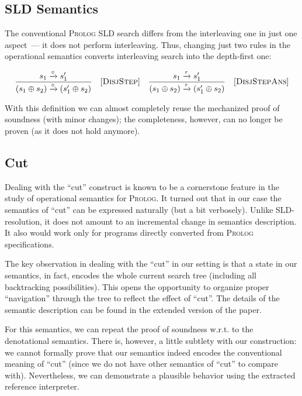 \subsection{SLD Semantics}
\label{sld}

The conventional \textsc{Prolog} SLD search differs from the interleaving one in just one aspect~--- it does not perform interleaving.
Thus, changing just two rules in the operational semantics converts interleaving search into the depth-first one:

\[
  \begin{array}{crcr}
    \dfrac{s_1 \xrightarrow{\circ} s'_1}{(s_1 \oplus s_2) \xrightarrow{\circ} (s'_1 \oplus s_2)} &\mbox{[\textsc{DisjStep}]}&
    \dfrac{s_1 \xrightarrow{r} s'_1}{(s_1 \oplus s_2) \xrightarrow{r} (s'_1 \oplus s_2)} &\mbox{[\textsc{DisjStepAns}]}
  \end{array}
\]
\vskip3mm

With this definition we can almost completely reuse the mechanized proof of soundness (with minor changes); the completeness, however,
can no longer be proven (as it does not hold anymore).

\subsection{Cut}
\label{cut}

Dealing with the ``cut'' construct is known to be a cornerstone feature in the study of operational semantics for \textsc{Prolog}. It turned out that
in our case the semantics of ``cut'' can be expressed naturally (but a bit verbosely). Unlike SLD-resolution, it does not amount to an incremental
change in semantics description. It also would work only for programs directly converted from \textsc{Prolog} specifications.

The key observation in dealing with the ``cut'' in our setting is that a state in our semantics, in fact, encodes the whole current
search tree (including all backtracking possibilities). This opens the opportunity to organize proper ``navigation'' through the tree
to reflect the effect of ``cut''. The details of the semantic description can be found in the extended version of the paper.

For this semantics, we can repeat the proof of soundness w.r.t. to the denotational semantics. There is, however, a little subtlety with our construction:
we cannot formally prove that our semantics indeed encodes the conventional meaning of ``cut'' (since we do not have other semantics of ``cut'' to compare with).
Nevertheless, we can demonstrate a plausible behavior using the extracted reference interpreter.

